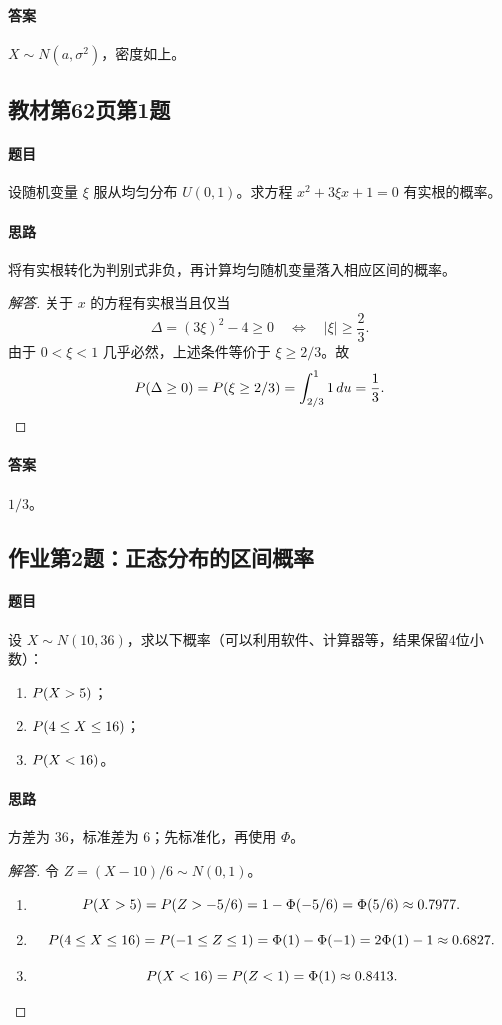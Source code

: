 \paragraph{答案} $X\sim N(a,\sigma^2)$，密度如上。

\subsection{教材第62页第1题}\label{ex:w09-b62-1}
\paragraph{题目}
设随机变量 $\xi$ 服从均匀分布 $U(0,1)$。求方程 $x^2+3\xi x+1=0$ 有实根的概率。
\paragraph{思路} 将有实根转化为判别式非负，再计算均匀随机变量落入相应区间的概率。
\begin{proof}[解答]
关于 $x$ 的方程有实根当且仅当
\[
\Delta=(3\xi)^2-4\geq0
\quad\Longleftrightarrow\quad |\xi|\geq\frac23.
\]
由于 $0<\xi<1$ 几乎必然，上述条件等价于 $\xi\geq2/3$。故
\[
\P(\Delta\geq0)=\P(\xi\geq2/3)=\int_{2/3}^{1}1\,du=\frac13.
\]
\end{proof}
\paragraph{答案} $1/3$。

\subsection{作业第2题：正态分布的区间概率}\label{ex:w09-h2}
\paragraph{题目}
设 $X\sim N(10,36)$，求以下概率（可以利用软件、计算器等，结果保留4位小数）：
\begin{enumerate}
\item $\P(X>5)$；
\item $\P(4\leq X\leq16)$；
\item $\P(X<16)$。
\end{enumerate}
\paragraph{思路} 方差为 $36$，标准差为 $6$；先标准化，再使用 $\Phi$。
\begin{proof}[解答]
令 $Z=(X-10)/6\sim N(0,1)$。
\begin{enumerate}
\item
\[
\P(X>5)=\P(Z>-5/6)
=1-\Phi(-5/6)=\Phi(5/6)\approx0.7977.
\]
\item
\[
\P(4\leq X\leq16)=\P(-1\leq Z\leq1)
=\Phi(1)-\Phi(-1)=2\Phi(1)-1\approx0.6827.
\]
\item
\[
\P(X<16)=\P(Z<1)=\Phi(1)\approx0.8413.
\]
\end{enumerate}
\end{proof}
